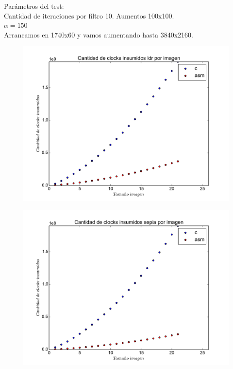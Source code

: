 Parámetros del test: \\
Cantidad de iteraciones por filtro 10. Aumentos 100x100.\\
$\alpha = 150$\\
Arrancamos en 1740x60 y vamos aumentando hasta 3840x2160.

\newpage

\begin{figure}
  \begin{center}
	\includegraphics[scale=0.5]{ldrall.pdf}
  \end{center}
\end{figure}

\begin{figure}
  \begin{center}
	\includegraphics[scale=0.5]{sepiaall.pdf}
  \end{center}
\end{figure}


